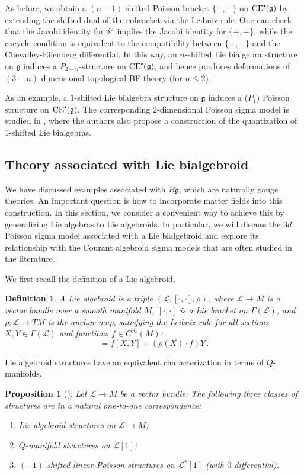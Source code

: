 \documentclass[11pt]{article}
\newcommand{\CE}{Chevalley-Eilenberg }
\newcommand\sbullet[1][.5]{\mathbin{\vcenter{\hbox{\scalebox{#1}{$\bullet$}}}}}
\numberwithin{equation}{section}
\newtheorem{definition}{Definition}[section]
\newtheorem{prop}{Proposition}[section]
\begin{document}
As before, we obtain a $(n-1)$-shifted Poisson bracket $\{-,-\}$ on $\mathrm{CE}^{\sbullet}(\mathfrak{g})$ by extending the shifted dual of the cobracket via the Leibniz rule. One can check that the Jacobi identity for $\delta^\vee$ implies the Jacobi identity for $\{-,-\}$, while the cocycle condition is equivalent to the compatibility between $\{-,-\}$ and the \CE differential. In this way, an $n$-shifted Lie bialgebra structure on $\mathfrak{g}$ induces a $P_{2-n}$-structure on $\mathrm{CE}^{\sbullet}(\mathfrak{g})$, and hence produces deformations of $(3-n)$-dimensional topological BF theory (for $n \leq 2$).

As an example, a $1$-shifted Lie bialgebra structure on $\mathfrak{g}$ induces a ($P_1$) Poisson structure on $\mathrm{CE}^{\sbullet}(\mathfrak{g})$. The corresponding $2$-dimensional Poisson sigma model is studied in \cite{Niu:2025kgk}, where the authors also propose a construction of the quantization of $1$-shifted Lie bialgebras.


\subsection{Theory associated with Lie bialgebroid}
We have discussed examples associated with $B\mathfrak{g}$, which are naturally gauge theories. An important question is how to incorporate matter fields into this construction. In this section, we consider a convenient way to achieve this by generalizing Lie algebras to Lie algebroids. In particular, we will discuss the $3d$ Poisson sigma model associated with a Lie bialgebroid and explore its relationship with the Courant algebroid sigma models that are often studied in the literature.

We first recall the definition of a Lie algebroid.
\begin{definition}
	A Lie algebroid is a triple $(\mathcal{L}, [\cdot, \cdot], \rho)$, where $\mathcal{L} \to M$ is a vector bundle over a smooth manifold $M$, $[\cdot, \cdot]$ is a Lie bracket on $\Gamma(\mathcal{L})$, and $\rho: \mathcal{L} \to TM$ is the anchor map, satisfying the Leibniz rule for all sections $X, Y \in \Gamma(\mathcal{L})$ and functions $f \in C^\infty(M)$:
	\begin{equation}
		[X, fY] = f[X, Y] + (\rho(X) \cdot f) Y\,.
	\end{equation}
\end{definition}

Lie algebroid structures have an equivalent characterization in terms of $Q$-manifolds. 
\begin{prop}[\cite{Vaintrob_1997}]\label{prop:Lie_algebroid_eqiv}
	Let $\mathcal{L} \to M$ be a vector bundle. The following three classes of structures are in a natural one-to-one correspondence:
	\begin{enumerate}
		\item Lie algebroid structures on $\mathcal{L} \to M$;
		\item $Q$-manifold structures on $\mathcal{L}[1]$;
		\item $(-1)$-shifted linear Poisson structures on $\mathcal{L}^*[1]$ (with $0$ differential).
	\end{enumerate}
\end{prop}
\end{document}
